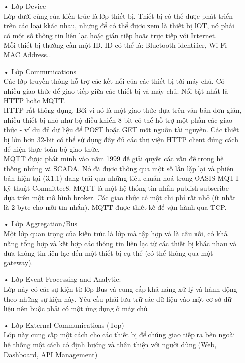 \begin{itemize}
	\item[•]Lớp Device \\
	Lớp dưới cùng của kiến trúc là lớp thiết bị. Thiết bị có thể được phát triển trên các loại khác nhau, nhưng để có thể được xem là thiết bị IOT, nó phải có một số thông tin liên lạc hoặc gián tiếp hoặc trực tiếp với Internet.\\
	Mỗi thiết bị thường cần một ID. ID có thể là: Bluetooth identifier, Wi-Fi MAC Address…
	\item[•]Lớp Communications \\
	Các lớp truyền thông hỗ trợ các kết nối của các thiết bị tới máy chủ. Có nhiều giao thức để giao tiếp giữa các thiết bị và máy chủ. Nổi bật nhất là HTTP hoặc MQTT.\\
	HTTP rất thông dụng. Bởi vì nó là một giao thức dựa trên văn bản đơn giản, nhiều thiết bị nhỏ như bộ điều khiển 8-bit có thể hỗ trợ một phần các giao thức - ví dụ đủ dữ liệu để POST hoặc GET một nguồn tài nguyên. Các thiết bị lớn hơn 32-bit có thể sử dụng đầy đủ các thư viện HTTP client đúng cách để hiện thực toàn bộ giao thức.\\
	MQTT được phát minh vào năm 1999 để giải quyết các vấn đề trong hệ thống nhúng và SCADA. Nó đã được thông qua một số lần lặp lại và phiên bản hiện tại (3.1.1) đang trải qua những tiêu chuẩn hoá trong OASIS MQTT kỹ thuật Committee8. MQTT là một hệ thống tin nhắn publish-subscribe dựa trên một mô hình broker. Các giao thức có một chi phí rất nhỏ (ít nhất là 2 byte cho mỗi tin nhắn). MQTT được thiết kế để vận hành qua TCP.
	\item[•]Lớp Aggregation/Bus \\
	Một lớp quan trọng của kiến trúc là lớp mà tập hợp và là cầu nối, có khả năng tổng hợp và kết hợp các thông tin liên lạc từ các thiết bị khác nhau và đưa thông tin liên lạc đến một thiết bị cụ thể (có thể thông qua một gateway).
	\item[•]Lớp Event Processing and Analytic: \\
	Lớp này có các sự kiện từ lớp Bus và cung cấp khả năng xử lý và hành động theo những sự kiện này. Yêu cầu phải lưu trữ các dữ liệu vào một cơ sở dữ liệu nên buộc phải có một ứng dụng ở máy chủ.
	\item[•]Lớp External Communications (Top) \\
	Lớp này cung cấp một cách cho các thiết bị để chúng giao tiếp ra bên ngoài hệ thống một cách có định hướng và thân thiện với người dùng (Web, Dashboard, API Management)
\end{itemize}


